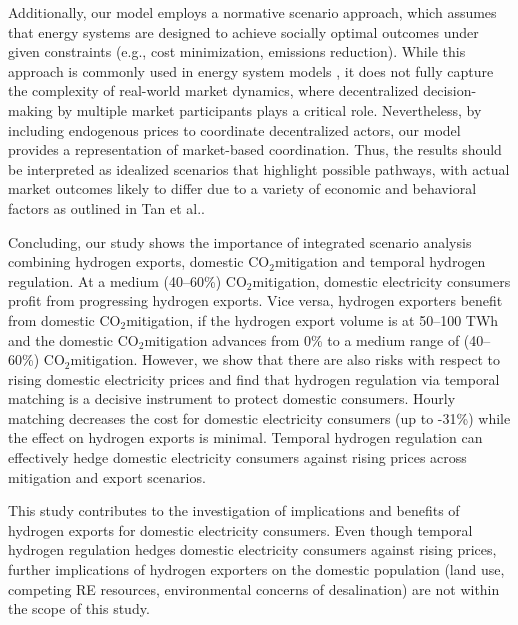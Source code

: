 \documentclass[5p,numafflabel]{elsarticle}
\newcommand{\co}{\ce{CO2}~}
\def\co{CO${}_2${\:}}
\begin{document}
Additionally, our model employs a normative scenario approach, which assumes that energy systems are designed to achieve socially optimal outcomes under given constraints (e.g., cost minimization, emissions reduction). While this approach is commonly used in energy system models \cite{Zeyen2023, Zeyen2024,Victoria2020,Franken2025,Neumann2024,Neumann2023,Neumann2022a,Neumann2021,Parzen2023,Horsch2018,Muller2024,Collins2018,Oyewo2023,Oyewo2024,Bauer2025,IEA2021}, it does not fully capture the complexity of real-world market dynamics, where decentralized decision-making by multiple market participants plays a critical role. Nevertheless, by including endogenous prices to coordinate decentralized actors, our model provides a representation of market-based coordination. Thus, the results should be interpreted as idealized scenarios that highlight possible pathways, with actual market outcomes likely to differ due to a variety of economic and behavioral factors as outlined in Tan et al.\cite{Tan2022}.

\label{sec:conclusion}



Concluding, our study shows the importance of integrated scenario analysis combining hydrogen exports, domestic \co mitigation and temporal hydrogen regulation.
At a medium (40--60\%) \co mitigation, domestic electricity consumers profit from progressing hydrogen exports. Vice versa, hydrogen exporters benefit from domestic \co mitigation, if the hydrogen export volume is at 50--100 TWh and the domestic \co mitigation advances from 0\% to a medium range of (40--60\%) \co mitigation. However, we show that there are also risks with respect to rising domestic electricity prices
and find that hydrogen regulation via temporal matching is a decisive instrument
to protect domestic consumers. Hourly matching decreases the cost for domestic electricity consumers (up to -31\%) while the effect on hydrogen exports is minimal. Temporal hydrogen regulation can effectively hedge domestic electricity consumers against rising prices across mitigation and export scenarios.

This study contributes to the investigation of implications and benefits of hydrogen exports for domestic electricity consumers. Even though temporal hydrogen regulation hedges domestic electricity consumers against rising prices, further implications of hydrogen exporters on the domestic population (land use, competing RE resources, environmental concerns of desalination) are not within the scope of this study.
\end{document}
